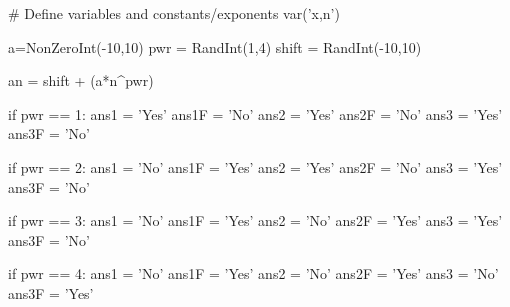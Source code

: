 



\begin{sagesilent}
# Define variables and constants/exponents
var('x,n')


a=NonZeroInt(-10,10)
pwr = RandInt(1,4)
shift = RandInt(-10,10)

an = shift + (a*n^pwr)



if pwr == 1:
   ans1 = 'Yes'
   ans1F = 'No'
   ans2 = 'Yes'
   ans2F = 'No'
   ans3 = 'Yes'
   ans3F = 'No'

if pwr == 2:
   ans1 = 'No'
   ans1F = 'Yes'
   ans2 = 'Yes'
   ans2F = 'No'
   ans3 = 'Yes'
   ans3F = 'No'

if pwr == 3:
   ans1 = 'No'
   ans1F = 'Yes'
   ans2 = 'No'
   ans2F = 'Yes'
   ans3 = 'Yes'
   ans3F = 'No'

if pwr == 4:
   ans1 = 'No'
   ans1F = 'Yes'
   ans2 = 'No'
   ans2F = 'Yes'
   ans3 = 'No'
   ans3F = 'Yes'

\end{sagesilent}

